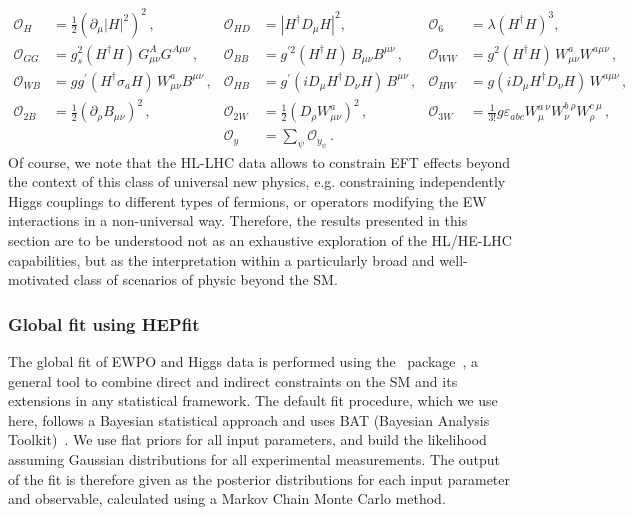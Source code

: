 \begin{align}
\label{eq:universal}
%
\mathcal{O}_{H} &=  
\frac{1}{2}(\partial_\mu \vert H \vert^2)^2 \,,
&
\mathcal{O}_{H D} &= 
|H^\dagger D_\mu H|^2 ,
&
\mathcal{O}_{6} &= 
\lambda (H^\dagger H)^3,  \nonumber \\
%
\mathcal{O}_{G G} &= 
g_s^2(H^\dagger H) \, G^A_{\mu\nu} G^{A\mu\nu}  \, ,
&
\mathcal{O}_{B B} &= 
g^{\prime 2}(H^\dagger H) \, B_{\mu\nu} B^{\mu\nu}  \, ,
&
\mathcal{O}_{W W} &= 
g^2(H^\dagger H) \, W^a_{\mu\nu} W^{a\mu\nu} \, ,\nonumber\\
%
\mathcal{O}_{W B} &= 
gg^{\prime}(H^\dagger \sigma_a H) \, W^a_{\mu\nu} B^{\mu\nu} \, ,
&
\mathcal{O}_{HB} &= 
g^\prime(i D_\mu H^\dagger D_\nu H) \, B^{\mu\nu} \, ,
&
\mathcal{O}_{HW} &= 
g(i D_\mu H^\dagger D_\nu H) \, W^{a\mu\nu} \, ,\nonumber\\
%
\mathcal{O}_{2B} &= 
\frac 12 (\partial_\rho B_{\mu\nu})^2  \, ,
&
\mathcal{O}_{2W} &= 
\frac 12 (D_\rho W^a_{\mu\nu})^2  \, ,
&
\mathcal{O}_{3W} &= 
\frac{1}{3!}g\varepsilon_{abc} W_{\mu}^{a~\nu} W_{\nu}^{b~\rho} W_{\rho}^{c~\mu} \, ,\nonumber\\
%
&&
\mathcal{O}_{y} &= 
\sum_\psi \mathcal{O}_{y_\psi} \, .
& &
\end{align}
%
Of course, we note that the HL-LHC data allows to constrain EFT effects beyond the context of this class of universal new physics, 
e.g. constraining independently Higgs couplings to different types of fermions, or operators modifying the EW interactions
in a non-universal way. Therefore, the results presented in this section are to be understood not as an exhaustive exploration 
of the HL/HE-LHC capabilities, but as the interpretation within a particularly broad and well-motivated class
of scenarios of physic beyond the SM.


\subsubsection{Global fit using HEPfit}
\label{sec:global-fit}

The global fit of EWPO and Higgs data is performed using the
\HEPfit~package~\cite{hepfitsite}, a general tool to combine direct
and indirect constraints on the SM and its extensions in any
statistical framework.  The default fit procedure, which we use here,
follows a Bayesian statistical approach and uses BAT (Bayesian
Analysis Toolkit)~\cite{Caldwell:2008fw}. We use flat priors for all
input parameters, and build the likelihood assuming Gaussian
distributions for all experimental measurements. The output of the fit
is therefore given as the posterior distributions for each input
parameter and observable, calculated using a Markov Chain Monte
Carlo method.

